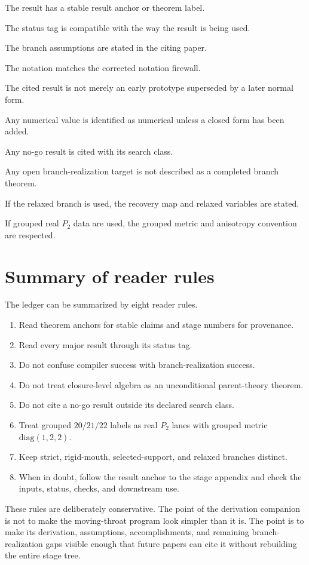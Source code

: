 \begin{verificationchecklist}
  \item The result has a stable result anchor or theorem label.
  \item The status tag is compatible with the way the result is being used.
  \item The branch assumptions are stated in the citing paper.
  \item The notation matches the corrected notation firewall.
  \item The cited result is not merely an early prototype superseded by a later normal form.
  \item Any numerical value is identified as numerical unless a closed form has been added.
  \item Any no-go result is cited with its search class.
  \item Any open branch-realization target is not described as a completed branch theorem.
  \item If the relaxed branch is used, the recovery map and relaxed variables are stated.
  \item If grouped real \(P_2\) data are used, the grouped metric and anisotropy convention are respected.
\end{verificationchecklist}

\section{Summary of reader rules}
\label{sec:summary-reader-rules}

The ledger can be summarized by eight reader rules.

\begin{enumerate}[leftmargin=2.2em]
  \item Read theorem anchors for stable claims and stage numbers for provenance.
  \item Read every major result through its status tag.
  \item Do not confuse compiler success with branch-realization success.
  \item Do not treat closure-level algebra as an unconditional parent-theory theorem.
  \item Do not cite a no-go result outside its declared search class.
  \item Treat grouped \(20/21/22\) labels as real \(P_2\) lanes with grouped metric \(\mathrm{diag}(1,2,2)\).
  \item Keep strict, rigid-mouth, selected-support, and relaxed branches distinct.
  \item When in doubt, follow the result anchor to the stage appendix and check the inputs, status, checks, and downstream use.
\end{enumerate}

These rules are deliberately conservative.  The point of the derivation companion is not to make the moving-throat program look simpler than it is.  The point is to make its derivation, assumptions, accomplishments, and remaining branch-realization gaps visible enough that future papers can cite it without rebuilding the entire stage tree.
